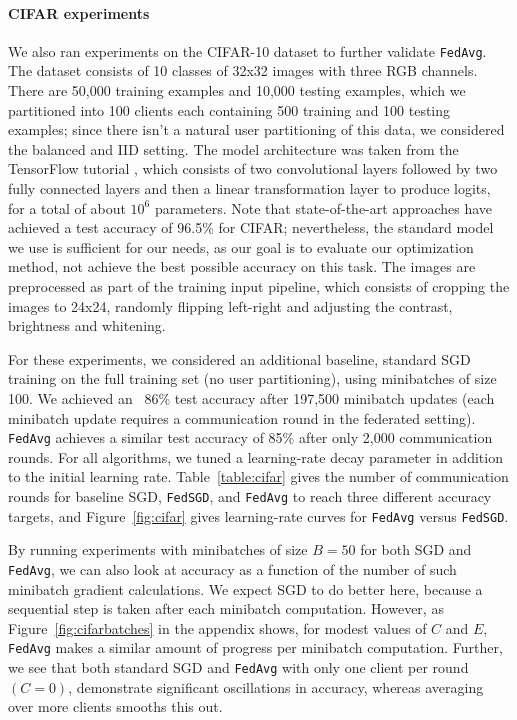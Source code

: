 \documentclass[twoside]{article}
\newcommand{\lbs}{\ensuremath{B}}      %
\newcommand{\lepochs}{\ensuremath{E}}  %
\newcommand{\clientfrac}{\ensuremath{C}}    %
\newcommand{\algfont}[1]{\texttt{#1}}
\newcommand{\fedavg}{\algfont{FedAvg}\xspace}
\newcommand{\fedavgshort}{\algfont{FedAvg}\xspace}
\newcommand{\fedsgd}{\algfont{FedSGD}\xspace}
\newcommand{\fedsgdshort}{\algfont{FedSGD}\xspace}
\begin{document}
\paragraph{CIFAR experiments}
We also ran experiments on the CIFAR-10 dataset
\citep{krizhevsky09cifar} to further validate \fedavg. The dataset
consists of 10 classes of 32x32 images with three RGB
channels. There are 50,000 training examples and 10,000 testing
examples, which we partitioned into 100 clients each containing 500
training and 100 testing examples; since there isn't a natural user
partitioning of this data, we considered the balanced and IID setting.
The model architecture was taken from the TensorFlow
tutorial \citep{tensorflowcifar}, which consists of two convolutional
layers followed by two fully connected layers and then a linear
transformation layer to produce logits, for a total of about $10^6$ parameters.
Note that state-of-the-art approaches have achieved a test accuracy of
96.5\% \citep{graham14fractional} for CIFAR; nevertheless, the
standard model we use is sufficient for our needs, as our goal is to
evaluate our optimization method, not achieve the best possible
accuracy on this task.
The images are preprocessed as part of the training input pipeline,
which consists of cropping the images to 24x24, randomly flipping
left-right and adjusting the contrast, brightness and whitening.

For these experiments, we considered an additional baseline, standard
SGD training on the full training set (no user partitioning), using
minibatches of size 100. We achieved an ~86\% test accuracy after
197,500 minibatch updates (each minibatch update requires a
communication round in the federated setting).
\fedavg achieves a similar test accuracy of 85\% after only 2,000
communication rounds. For all algorithms, we tuned a learning-rate
decay parameter in addition to the initial learning rate.
Table~\ref{table:cifar} gives the number of communication rounds for
baseline SGD, \fedsgd, and \fedavg to reach three different accuracy
targets, and Figure~\ref{fig:cifar} gives learning-rate curves for
\fedavgshort versus \fedsgdshort.

By running experiments with minibatches of size $\lbs=50$ for both SGD
and \fedavg, we can also look at accuracy as a function of the number
of such minibatch gradient calculations. We expect SGD to do
better here, because a sequential step is taken after each minibatch
computation. However, as Figure~\ref{fig:cifarbatches} in the appendix
shows, for modest values of $\clientfrac$ and $\lepochs$, \fedavg makes
a similar amount of progress per minibatch computation. Further, we
see that both standard SGD and \fedavgshort with only one client per
round $(\clientfrac = 0)$, demonstrate significant oscillations in
accuracy, whereas averaging over more clients smooths this out.
\end{document}
